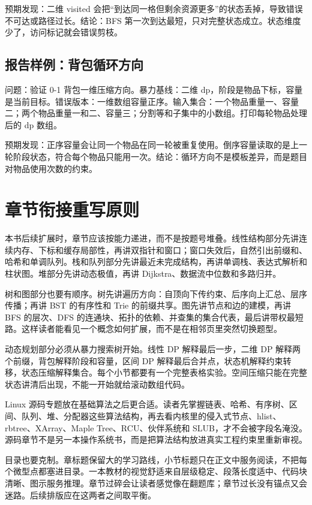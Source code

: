 预期发现：二维 visited 会把“到达同一格但剩余资源更多”的状态丢掉，导致错误不可达或路径过长。结论：BFS 第一次到达最短，只对完整状态成立。状态维度少了，访问标记就会错误剪枝。

\subsection{报告样例：背包循环方向}

问题：验证 0-1 背包一维压缩方向。暴力基线：二维 dp，阶段是物品下标，容量是当前目标。错误版本：一维数组容量正序。输入集合：一个物品重量一、容量二；两个物品重量一和二、容量三；分割等和子集中的小数组。打印每轮物品处理后的 dp 数组。

预期发现：正序容量会让同一个物品在同一轮被重复使用。倒序容量读取的是上一轮阶段状态，符合每个物品只能用一次。结论：循环方向不是模板差异，而是题目对物品使用次数的约束。

\section{章节衔接重写原则}

本书后续扩展时，章节应该按能力递进，而不是按题号堆叠。线性结构部分先讲连续内存、下标和缓存局部性，再讲双指针和窗口；窗口失效后，自然引出前缀和、哈希和单调队列。栈和队列部分先讲最近未完成结构，再讲单调栈、表达式解析和柱状图。堆部分先讲动态极值，再讲 Dijkstra、数据流中位数和多路归并。

树和图部分也要有顺序。树先讲遍历方向：自顶向下传约束、后序向上汇总、层序传播；再讲 BST 的有序性和 Trie 的前缀共享。图先讲节点和边的建模，再讲 BFS 的层次、DFS 的连通块、拓扑的依赖、并查集的集合代表，最后讲带权最短路。这样读者能看见一个概念如何扩展，而不是在相邻页里突然切换题型。

动态规划部分必须从暴力搜索树开始。线性 DP 解释最后一步，二维 DP 解释两个前缀，背包解释阶段和容量，区间 DP 解释最后合并点，状态机解释约束转移，状态压缩解释集合。每个小节都要有一个完整表格实验。空间压缩只能在完整状态讲清后出现，不能一开始就给滚动数组代码。

Linux 源码专题放在基础算法之后更合适。读者先掌握链表、哈希、有序树、区间、队列、堆、分配器这些算法结构，再去看内核里的侵入式节点、hlist、rbtree、XArray、Maple Tree、RCU、伙伴系统和 SLUB，才不会被字段名淹没。源码章节不是另一本操作系统书，而是把算法结构放进真实工程约束里重新审视。

目录也要克制。章标题保留大的学习路线，小节标题只在正文中服务阅读，不把每个微型点都塞进目录。一本教材的视觉舒适来自层级稳定、段落长度适中、代码块清晰、图示服务推理。章节过碎会让读者感觉像在翻题库；章节过长没有锚点又会迷路。后续排版应在这两者之间取平衡。


